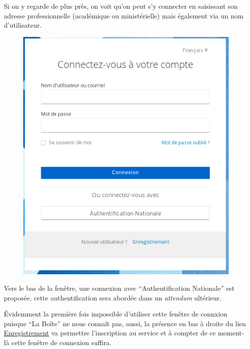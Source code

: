 \documentclass[a4paper, 11pt]{book}
\begin{document}
Si on y regarde de plus près, on voit qu'on peut s'y connecter en saisissant son adresse professionnelle (académique ou ministérielle) mais également via un nom d'utilisateur. 
\begin{figure}
	\centering
	\includegraphics{./Captures/portail.site.web.connexion.zoom.png}
\end{figure}
Vers le bas de la fenêtre, une connexion avec ``Authentification Nationale'' est proposée, cette authentification sera abordée dans un \emph{attendum} ultérieur.

Évidemment la première fois impossible d'utiliser cette fenêtre de connxion puisque ``La Boîte'' ne nous connaît pas, aussi, la présence en bas à droite du lien \href{https://auth.apps.education.fr/auth/realms/apps/login-actions/registration?client_id=sso&tab_id=bVmOhc3T6kQ}{Enregistrement} va permettre l'inscription au service et à compter de ce moment-là cette fenêtre de connexion suffira.
\end{document}
